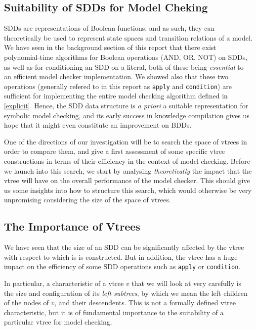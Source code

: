 \documentclass[11pt]{report}
\begin{document}
\subsection{Suitability of SDDs for Model Cheking}

SDDs are representations of Boolean functions, and as such, they can theoretically be used to represent state spaces and transition relations of a model. We have seen in the background section of this report that there exist polynomial-time algorithms for Boolean operations (AND, OR, NOT) on SDDs, as well as for conditioning an SDD on a literal, both of these being \textit{essential} to an efficient model checker implementation. We showed also that these two operations (generally refered to in this report as \texttt{apply} and \texttt{condition}) are sufficient for implementing the entire model checking algorithm defined in \ref{explicit}. Hence, the SDD data structure is \textit{a priori} a suitable representation for symbolic model checking, and its early success \cite{sdd_3} in knowledge compilation gives us hope that it might even constitute an improvement on BDDs. 

One of the directions of our investigation will be to search the space of vtrees in order to compare them, and give a first assessment of some specific vtree constructions in terms of their efficiency in the context of model checking. Before we launch into this search, we start by analysing \textit{theoretically} the impact that the vtree will have on the overall performance of the model checker. This should give us some insights into how to structure this search, which would otherwise be very unpromising considering the size of the space of vtrees.

\subsection{The Importance of Vtrees} 

We have seen that the size of an SDD can be significantly affected by the vtree with respect to which is is constructed. But in addition, the vtree has a huge impact on the efficiency of some SDD operations such as \texttt{apply} or \texttt{condition}. 

In particular, a characteristic of a vtree $v$ that we will look at very carefully is the size and configuration of its \textit{left subtrees}, by which we mean the left children of the nodes of $v$, and their descendents.	This is not a formally defined vtree characteristic, but it is of fundamental importance to the suitability of a particular vtree for model checking. 
\end{document}
